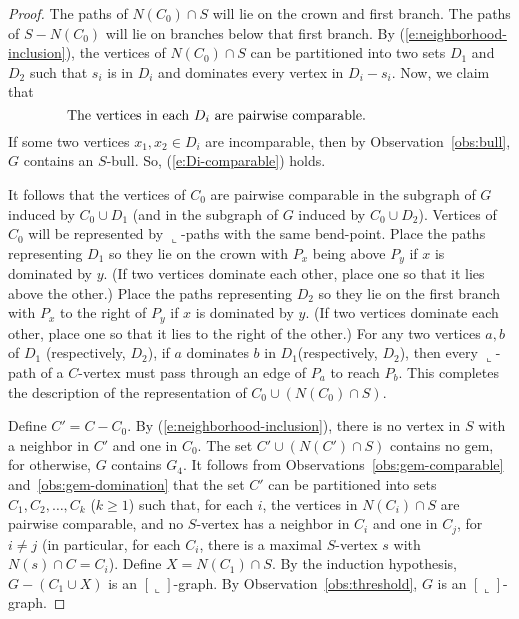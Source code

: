 \documentclass[11pt,3p,times]{elsarticle}
\newenvironment{myproof}{\begin{proof}}{\end{proof}}
\newcommand{\La}{\ensuremath{\llcorner}} \newcommand{\Lb}{\ensuremath{\ulcorner}} \newcommand{\Lc}{\ensuremath{\lrcorner}} \newcommand{\Ld}{\ensuremath{\urcorner}}
\begin{document}
\begin{myproof}
The paths of $ N(C_0) \cap S$ will lie on the
crown and first branch. The paths of $S- N(C_0)$ will lie on
branches below that first branch. By
(\ref{e:neighborhood-inclusion}), the vertices of  $N(C_0) \cap S$
can be partitioned into two sets $D_1$ and $ D_2$ such that $s_i$
is in $D_i$ and dominates every vertex in $D_i - s_i$. Now, we
claim that
\begin{equation}\begin{minipage}{0.8\linewidth}\label{e:Di-comparable}
The vertices in each $D_i$ are pairwise comparable.
\end{minipage}\end{equation}
If some two vertices $x_1, x_2 \in D_i$ are incomparable, then by
Observation~\ref{obs:bull}, $G$ contains an $S$-bull. So,
(\ref{e:Di-comparable}) holds.

It follows that the vertices of
$C_0$ are pairwise comparable in the subgraph of $G$ induced by
 $C_0 \cup D_1$ (and in the subgraph of $G$ induced by $C_0 \cup D _2$).
Vertices of $C_0$ will be
represented by $\La$-paths with the same bend-point. Place the
paths representing $D_1$ so they lie on the crown with $P_x$ being above $P_y$
if $x$ is dominated by $y$. (If two vertices dominate each other,
place one so that it lies above the other.) Place the paths representing $D_2$
so they lie on
the first branch with $P_x$ to the right of $P_y$ if $x$ is
dominated by $y$. (If two vertices dominate each other,
place one so that it lies to the right of the other.) For any two vertices $a,b$ of $D_1$ (respectively,
$D_2$), if $a$ dominates $b$ in $D_1$(respectively, $D_2$), then every
$\La$-path of a $C$-vertex must pass through an edge of $P_a$ to
reach $P_b$. This completes the description of the representation
of $C_0 \cup (N(C_0) \cap S)$.



Define $C' = C - C_0$. By (\ref{e:neighborhood-inclusion}), there
is no vertex in $S$ with a neighbor in $C'$ and one in $C_0$. The
set $C' \cup (N(C') \cap S)$ contains no gem, for otherwise, $G$
contains $G_4$.
It follows from Observations~\ref{obs:gem-comparable}
and~\ref{obs:gem-domination} that the set $C'$ can be partitioned
into sets $C_1, C_2, \ldots, C_k$ ($k \geq 1$) such that, for each
$i$, the vertices in $N(C_i) \cap S$ are pairwise comparable, and
no $S$-vertex has a neighbor in $C_i$ and one in $C_j$, for $i
\not= j$ (in particular, for each $C_i$, there is a maximal
$S$-vertex $s$ with $N(s) \cap C = C_i$). Define $X= N(C_1) \cap
S$. By the induction hypothesis, $G- (C_1 \cup X)$ is an
$[\La]$-graph. By Observation~\ref{obs:threshold}, $G$ is  an
$[\La]$-graph. 
\end{myproof}
\end{document}
